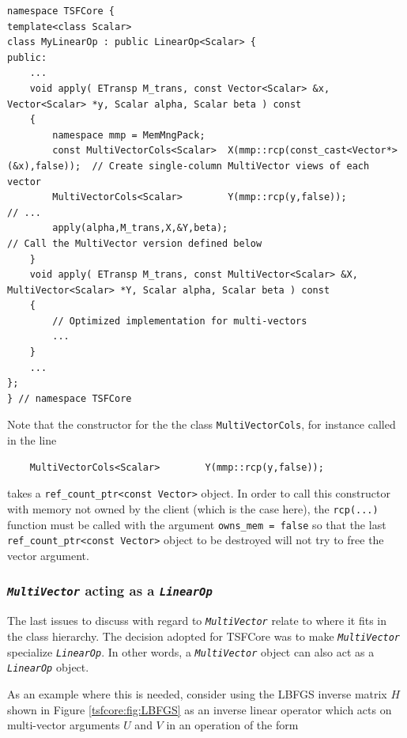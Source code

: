 \documentclass[10pt,fleqn]{article}
\begin{document}
{\scriptsize\begin{verbatim}
namespace TSFCore {
template<class Scalar>
class MyLinearOp : public LinearOp<Scalar> {
public:
    ...
    void apply( ETransp M_trans, const Vector<Scalar> &x, Vector<Scalar> *y, Scalar alpha, Scalar beta ) const
    {
        namespace mmp = MemMngPack;
        const MultiVectorCols<Scalar>  X(mmp::rcp(const_cast<Vector*>(&x),false));  // Create single-column MultiVector views of each vector
        MultiVectorCols<Scalar>        Y(mmp::rcp(y,false));                        // ...
        apply(alpha,M_trans,X,&Y,beta);                                             // Call the MultiVector version defined below
    }
    void apply( ETransp M_trans, const MultiVector<Scalar> &X, MultiVector<Scalar> *Y, Scalar alpha, Scalar beta ) const
    {
        // Optimized implementation for multi-vectors
        ...
    }
    ...
};
} // namespace TSFCore
\end{verbatim}}

Note that the constructor for the the class \texttt{MultiVectorCols},
for instance called in the line

{\scriptsize\begin{verbatim}
    MultiVectorCols<Scalar>        Y(mmp::rcp(y,false));
\end{verbatim}}

takes a \texttt{ref\_count\_ptr<const Vector>} object.  In order to
call this constructor with memory not owned by the client (which is
the case here), the \texttt{rcp(...)} function must be called with the
argument \texttt{owns\_mem = false} so that the last
\texttt{ref\_count\_ptr<const Vector>} object to be destroyed will not try
to free the vector argument.

%
\subsubsection{\texttt{\textit{MultiVector}} acting as a \texttt{\textit{LinearOp}}}
\label{tsfcore:sec:multi_vec_linear_op}
%

The last issues to discuss with regard to
\texttt{\textit{MultiVector}} relate to where it fits in the class
hierarchy.  The decision adopted for TSFCore was to make
\texttt{\textit{MultiVector}} specialize \texttt{\textit{LinearOp}}.
In other words, a \texttt{\textit{MultiVector}} object can also act as
a \texttt{\textit{LinearOp}} object.

As an example where this is needed, consider using the LBFGS inverse
matrix $H$ shown in Figure \ref{tsfcore:fig:LBFGS} as an inverse linear
operator which acts on multi-vector arguments $U$ and $V$ in an
operation of the form
\end{document}
